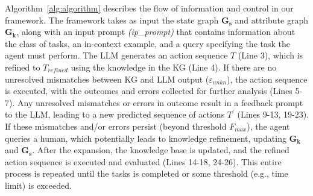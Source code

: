 \vspace{-0.75em}
Algorithm~\ref{alg:algorithm} describes the flow of information and control in our framework. The framework takes as input the state graph $\mathbf{G_s}$ and attribute graph $\mathbf{G_k}$, along with an input prompt \textit{(ip\_prompt)} that contains information about the class of tasks, an in-context example, and a query specifying the task the agent must perform. The LLM generates an action sequence $T$ (Line 3), which is refined to $T_{refined}$ using the knowledge in the KG (Line 4). If there are no unresolved mismatches between KG and LLM output ($\varepsilon_{unkn}$), the action sequence is executed, with the outcomes and errors collected for further analysis (Lines 5-7). Any unresolved mismatches or errors in outcome result in a feedback prompt to the LLM, leading to a new predicted sequence of actions $T^{'}$ (Lines 9-13, 19-23). If these mismatches and/or errors persist (beyond threshold $F_{max}$), the agent queries a human, which potentially leads to knowledge refinement, updating $\mathbf{G_k}$ and $\mathbf{G_s}$. After the expansion, the knowledge base is updated, and the refined action sequence is executed and evaluated (Lines 14-18, 24-26). This entire process is repeated until the tasks is completed or some threshold (e.g., time limit) is exceeded.
